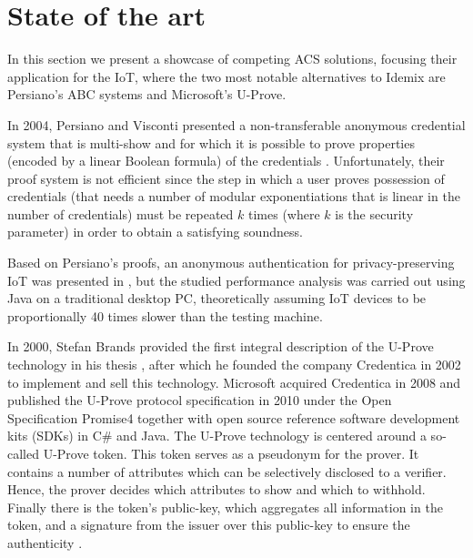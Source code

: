\section{State of the art}\label{ch:stateoftheart}

In this section we present a showcase of competing ACS solutions, focusing their application for the IoT, where the two most notable alternatives to Idemix are Persiano's ABC systems and Microsoft's U-Prove.



In 2004, Persiano and Visconti presented a non-transferable anonymous
credential system that is multi-show and for which it is possible to prove
properties (encoded by a linear Boolean formula) of the credentials \cite{Persiano2004}. Unfortunately, their proof system is not efficient since the step in which a user proves possession of credentials (that needs a number of modular exponentiations that is linear in the number of credentials) must be repeated $k$ times (where $k$ is the security parameter) in order to obtain a satisfying soundness.


Based on Persiano's proofs, an anonymous authentication for privacy-preserving IoT was presented in \cite{alcaide2013anonymous}, but the studied performance analysis was carried out using Java on a traditional desktop PC, theoretically assuming IoT devices to be proportionally 40 times slower than the testing machine.




In 2000, Stefan Brands provided the first integral description of the U-Prove
technology in his thesis \cite{uprove}, after which he founded the company Credentica
in 2002 to implement and sell this technology. Microsoft acquired Credentica
in 2008 and published the U-Prove protocol specification \cite{uprove2} in 2010
under the Open Specification Promise4 together with open source reference software
development kits (SDKs) in C\# and Java.
The U-Prove technology is centered around a so-called U-Prove token. This
token serves as a pseudonym for the prover. It contains a number of attributes
which can be selectively disclosed to a verifier. Hence, the prover decides which
attributes to show and which to withhold. Finally there is the token’s public-key, which aggregates all information in the token, and a signature from the issuer
over this public-key to ensure the authenticity \cite{book:947508}.



